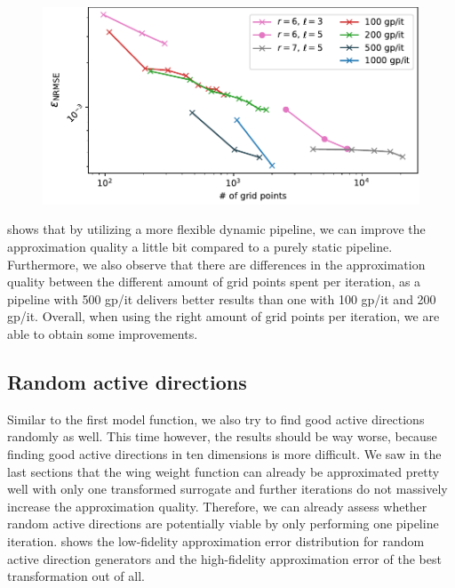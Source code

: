 \documentclass[
  a4paper,  %
  twoside,  %
  bibliography=totoc,
  headsepline,
  cleardoublepage=empty,
  parskip=half,
  draft=false
]{scrbook}
\begin{document}
\begin{mdframed}[style=style]
\begin{figure}[H]
\vspace{-2mm}
\includegraphics[width=\textwidth]{graphics/ww_dynamic}\vspace{-4mm}
\delimit
{}
\label{fig:ww_dyn}
\end{figure}
\end{mdframed}
%
 shows that by utilizing a more flexible dynamic pipeline, we can improve the approximation quality a little bit compared to a purely static pipeline.
Furthermore, we also observe that there are differences in the approximation quality between the different amount of grid points spent per iteration, as a pipeline with 500 gp/it delivers better results than one with 100 gp/it and 200 gp/it.
Overall, when using the right amount of grid points per iteration, we are able to obtain some improvements.

\subsection{Random active directions}

Similar to the first model function, we also try to find good active directions randomly as well.
This time however, the results should be way worse, because finding good active directions in ten dimensions is more difficult.
We saw in the last sections that the wing weight function can already be approximated pretty well with only one transformed surrogate and further iterations do not massively increase the approximation quality.
Therefore, we can already assess whether random active directions are potentially viable by only performing one pipeline iteration.
 shows the low-fidelity approximation error distribution for random active direction generators and the high-fidelity approximation error of the best transformation out of all.
\end{document}
